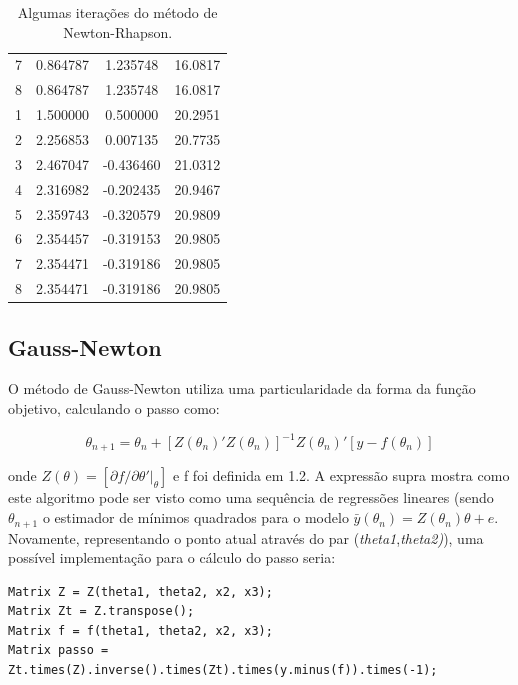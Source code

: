 \documentclass{abnt}
\newenvironment{mylisting}
{\begin{list}{}{\setlength{\leftmargin}{1em}}\item\scriptsize\bfseries}
{\end{list}}
\begin{document}
\begin{table}
\begin{center}
\begin{tabular}{ r | c c r  }
                        7 & 0.864787 & 1.235748 & 16.0817 \\
                        8 & 0.864787 & 1.235748 & 16.0817 \\
                        \hline
                        1 & 1.500000 & 0.500000 & 20.2951 \\
                        2 & 2.256853 & 0.007135 & 20.7735 \\
                        3 & 2.467047 & -0.436460 & 21.0312 \\
                        4 & 2.316982 & -0.202435 & 20.9467 \\
                        5 & 2.359743 & -0.320579 & 20.9809 \\
                        6 & 2.354457 & -0.319153 & 20.9805 \\
                        7 & 2.354471 & -0.319186 & 20.9805 \\
                        8 & 2.354471 & -0.319186 & 20.9805 \\
                        \hline
                \end{tabular}
        \end{center}
        \caption{Algumas iterações do método de Newton-Rhapson.}
        \label{resultados_nr}
\end{table}

\subsection{Gauss-Newton}

	O método de Gauss-Newton utiliza uma particularidade da forma da função objetivo, calculando o passo como:

\[ \theta_{n+1} = \theta_{n} + [Z(\theta_n)'Z(\theta_n)]^{-1}Z(\theta_n)'[y-f(\theta_n)] \]

		onde $Z(\theta)=[\partial f/ \partial \theta'\vert_{\theta}]$ e f foi definida em 1.2. A expressão supra  mostra como este algoritmo pode ser visto como uma sequência de regressões lineares (sendo $\theta_{n+1}$ o estimador de mínimos quadrados para o modelo $\bar y(\theta_{n})=Z(\theta_{n})\theta + e$. Novamente, representando o ponto atual através do par (\textit{theta1},\textit{theta2)}), uma possível implementação para o cálculo do passo seria:

\begin{mylisting}
\begin{verbatim}
Matrix Z = Z(theta1, theta2, x2, x3); 
Matrix Zt = Z.transpose(); 
Matrix f = f(theta1, theta2, x2, x3); 
Matrix passo = Zt.times(Z).inverse().times(Zt).times(y.minus(f)).times(-1); 
\end{verbatim}
\end{mylisting}
\end{document}
